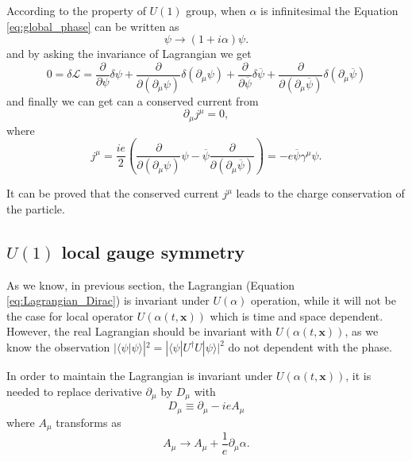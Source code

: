 According to the property of $U(1)$ group, when $\alpha$ is infinitesimal the Equation \ref{eq:global_phase} can be written as
\begin{equation}
\psi\rightarrow (1+i\alpha)\psi.
\label{eq:global_phase_1}
\end{equation}
and by asking the invariance of Lagrangian we get
\begin{equation}
0=\delta\mathcal{L}=\frac{\partial}{\partial \psi}\delta\psi+\frac{\partial}{\partial (\partial_\mu \psi)}\delta(\partial_\mu \psi)+\frac{\partial}{\partial \overline{\psi}}\delta\overline{\psi}+\frac{\partial}{\partial (\partial_\mu \overline{\psi})}\delta(\partial_\mu \overline{\psi})
\label{eq:global_phase_2}
\end{equation}
and finally we can get can a conserved current from
\begin{equation}
\partial_\mu j^{\mu}=0,
\label{eq:global_phase_3}
\end{equation}
where
\begin{equation}
j^{\mu}=\frac{ie}{2}(\frac{\partial}{\partial (\partial_\mu \psi)}\psi-\overline{\psi}\frac{\partial}{\partial (\partial_\mu \overline{\psi})})=-e\overline{\psi}\gamma^{\mu}\psi.
\label{eq:global_phase_4}
\end{equation}

It can be proved that the conserved current $j^{\mu}$ leads to the charge conservation of the particle.


\subsection{$U(1)$ local gauge symmetry}\label{subsec:U1_local}

As we know, in previous section, the Lagrangian (Equation \ref{eq:Lagrangian_Dirac}) is invariant under $U(\alpha)$ operation, while it will not be the case for local operator $U(\alpha(t,\mathbf{x}))$ which is time and space dependent. However, the real Lagrangian should be invariant with $U(\alpha(t,\mathbf{x}))$, as we know the observation $|\langle\psi|\psi\rangle|^2=|\langle\psi|U^{\dag}U|\psi\rangle|^2$ do not dependent with the phase.

In order to maintain the Lagrangian is invariant under $U(\alpha(t,\mathbf{x}))$, it is needed to replace derivative $\partial_\mu$ by $D_\mu$ with
\begin{equation}
D_\mu\equiv\partial_\mu-ieA_\mu
\label{eq:D_mu}
\end{equation}
where $A_\mu$ transforms as
\begin{equation}
A_\mu\rightarrow A_\mu+\frac{1}{e}\partial_\mu\alpha.
\label{eq:A_mu}
\end{equation}

